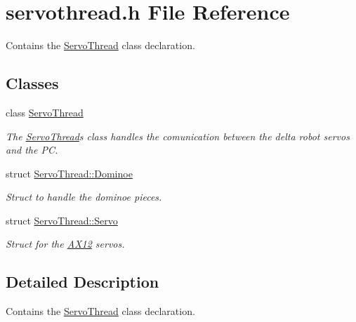\hypertarget{a00024}{}\section{servothread.\+h File Reference}
\label{a00024}


Contains the \hyperlink{a00009}{Servo\+Thread} class declaration.  


\subsection*{Classes}
\begin{DoxyCompactItemize}
\item 
class \hyperlink{a00009}{Servo\+Thread}
\begin{DoxyCompactList}\small\item\em The \hyperlink{a00009}{Servo\+Thread}\textquotesingle{}s class handles the comunication between the delta robot servos and the P\+C. \end{DoxyCompactList}\item 
struct \hyperlink{a00002}{Servo\+Thread\+::\+Dominoe}
\begin{DoxyCompactList}\small\item\em Struct to handle the dominoe pieces. \end{DoxyCompactList}\item 
struct \hyperlink{a00007}{Servo\+Thread\+::\+Servo}
\begin{DoxyCompactList}\small\item\em Struct for the \hyperlink{a00001}{A\+X12} servos. \end{DoxyCompactList}\end{DoxyCompactItemize}


\subsection{Detailed Description}
Contains the \hyperlink{a00009}{Servo\+Thread} class declaration. 


